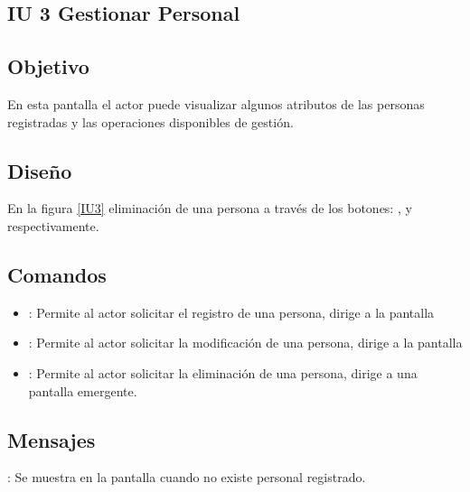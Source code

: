 \subsection{IU 3 Gestionar Personal}

\subsection{Objetivo}
	En esta pantalla el actor puede visualizar algunos atributos de las personas registradas y las operaciones disponibles de gestión.
\subsection{Diseño}
	En la figura \ref{IU3} eliminación de una persona a través de los botones: , \editar y \eliminar respectivamente.

\label{IU3}
\subsection{Comandos}
\begin{itemize}
	\item {}: Permite al actor solicitar el registro de una persona, dirige a la pantalla 
	\item \editar [Modificar]: Permite al actor solicitar la modificación de una persona, dirige a la pantalla 
	\item \eliminar [Eliminar]: Permite al actor solicitar la eliminación de una persona, dirige a una pantalla emergente.
\end{itemize}

\subsection{Mensajes}

\begin{Citemize}
	\item {}: Se muestra en la pantalla  cuando no existe personal registrado.
\end{Citemize}
